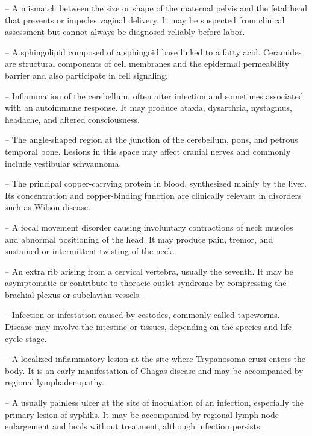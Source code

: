 -- A mismatch between the size or shape of the maternal pelvis and the fetal head that prevents or impedes vaginal delivery. It may be suspected from clinical assessment but cannot always be diagnosed reliably before labor.

-- A sphingolipid composed of a sphingoid base linked to a fatty acid. Ceramides are structural components of cell membranes and the epidermal permeability barrier and also participate in cell signaling.

-- Inflammation of the cerebellum, often after infection and sometimes associated with an autoimmune response. It may produce ataxia, dysarthria, nystagmus, headache, and altered consciousness.

-- The angle-shaped region at the junction of the cerebellum, pons, and petrous temporal bone. Lesions in this space may affect cranial nerves and commonly include vestibular schwannoma.

-- The principal copper-carrying protein in blood, synthesized mainly by the liver. Its concentration and copper-binding function are clinically relevant in disorders such as Wilson disease.

-- A focal movement disorder causing involuntary contractions of neck muscles and abnormal positioning of the head. It may produce pain, tremor, and sustained or intermittent twisting of the neck.

-- An extra rib arising from a cervical vertebra, usually the seventh. It may be asymptomatic or contribute to thoracic outlet syndrome by compressing the brachial plexus or subclavian vessels.

-- Infection or infestation caused by cestodes, commonly called tapeworms. Disease may involve the intestine or tissues, depending on the species and life-cycle stage.

-- A localized inflammatory lesion at the site where Trypanosoma cruzi enters the body. It is an early manifestation of Chagas disease and may be accompanied by regional lymphadenopathy.

-- A usually painless ulcer at the site of inoculation of an infection, especially the primary lesion of syphilis. It may be accompanied by regional lymph-node enlargement and heals without treatment, although infection persists.

